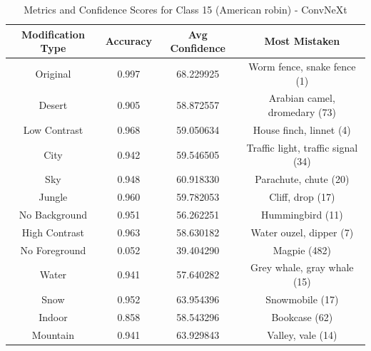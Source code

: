 \begin{table}
	\centering
	\begin{tabular}{|c|c|c|c|}
		\hline
		\textbf{Modification Type} & \textbf{Accuracy} & \textbf{Avg Confidence} & \textbf{Most Mistaken} \\
		\hline
		Original & 0.997 & 68.229925 & Worm fence, snake fence (1) \\
		\hline
		Desert & 0.905 & 58.872557 & Arabian camel, dromedary (73) \\
		\hline
		Low Contrast & 0.968 & 59.050634 & House finch, linnet (4) \\
		\hline
		City & 0.942 & 59.546505 & Traffic light, traffic signal (34) \\
		\hline
		Sky & 0.948 & 60.918330 & Parachute, chute (20) \\
		\hline
		Jungle & 0.960 & 59.782053 & Cliff, drop (17) \\
		\hline
		No Background & 0.951 & 56.262251 & Hummingbird (11) \\
		\hline
		High Contrast & 0.963 & 58.630182 & Water ouzel, dipper (7) \\
		\hline
		No Foreground & 0.052 & 39.404290 & Magpie (482) \\
		\hline
		Water & 0.941 & 57.640282 & Grey whale, gray whale (15) \\
		\hline
		Snow & 0.952 & 63.954396 & Snowmobile (17) \\
		\hline
		Indoor & 0.858 & 58.543296 & Bookcase (62) \\
		\hline
		Mountain & 0.941 & 63.929843 & Valley, vale (14) \\
		\hline
	\end{tabular}
	\caption{Metrics and Confidence Scores for Class 15 (American robin) - ConvNeXt}
	\label{tab:metrics_confidence_class_15_convnext}
\end{table}
